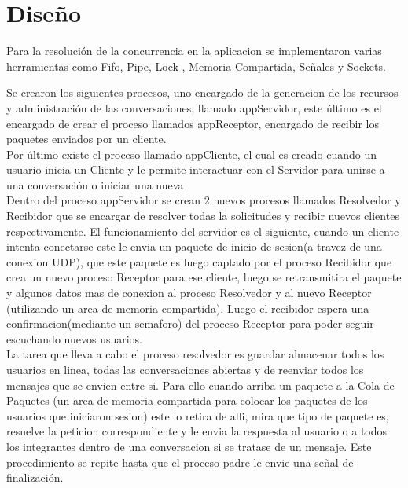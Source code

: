 \documentclass[a4paper,12pt,titlepage]{article}
\begin{document}
\newpage
\section{Diseño}

Para la resolución de la concurrencia en la aplicacion se implementaron varias herramientas como Fifo, Pipe, Lock , 
Memoria Compartida, Señales y Sockets.

Se crearon los siguientes procesos, uno encargado de la generacion de los recursos y administración de las conversaciones, llamado 
appServidor, este último es el encargado de crear el proceso llamados appReceptor, encargado de recibir los paquetes enviados por un cliente.\\

Por último existe el proceso llamado appCliente, el cual es creado cuando un usuario inicia un Cliente y le permite interactuar con
el Servidor para unirse a una conversación o iniciar una nueva\\


Dentro del proceso appServidor se crean 2 nuevos procesos llamados Resolvedor y Recibidor que se encargar de resolver todas la solicitudes y recibir nuevos clientes respectivamente.
El funcionamiento del servidor es el siguiente, cuando un cliente intenta conectarse este le envia un paquete de inicio de sesion(a travez de una conexion UDP), que este paquete es luego captado por el proceso Recibidor que crea un nuevo proceso Receptor para ese cliente, luego se retransmitira el paquete y algunos datos mas de conexion al proceso Resolvedor y al nuevo Receptor (utilizando un area de memoria compartida). Luego el recibidor espera una confirmacion(mediante un semaforo) del proceso Receptor para poder seguir escuchando nuevos usuarios.\\

La tarea que lleva a cabo el proceso resolvedor es guardar almacenar todos los usuarios en linea, todas las conversaciones abiertas y de reenviar todos los mensajes que se envien entre si. Para ello cuando arriba un paquete a la Cola de Paquetes (un area de memoria compartida para colocar los paquetes de los usuarios que iniciaron sesion) este lo retira de alli, mira que tipo de paquete es, resuelve la peticion correspondiente y le envia la respuesta al usuario o a todos los integrantes dentro de una conversacion si se tratase de un mensaje. Este procedimiento se repite hasta que el proceso padre le envie una señal de finalización.\\
\end{document}
